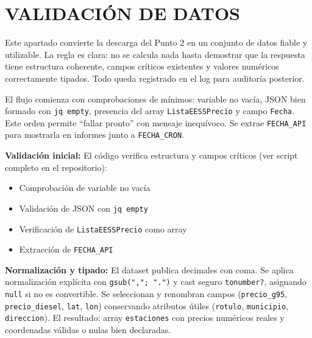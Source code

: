 \chapter{VALIDACIÓN DE DATOS}

Este apartado convierte la descarga del Punto 2 en un conjunto de datos fiable y utilizable. La regla es clara: no se calcula nada hasta demostrar que la respuesta tiene estructura coherente, campos críticos existentes y valores numéricos correctamente tipados. Todo queda registrado en el log para auditoría posterior.

El flujo comienza con comprobaciones de mínimos: variable no vacía, JSON bien formado con \texttt{jq empty}, presencia del array \texttt{ListaEESSPrecio} y campo \texttt{Fecha}. Este orden permite ``fallar pronto'' con mensaje inequívoco. Se extrae \texttt{FECHA\_API} para mostrarla en informes junto a \texttt{FECHA\_CRON}.

\textbf{Validación inicial:} El código verifica estructura y campos críticos (ver script completo en el repositorio):

\begin{itemize}[noitemsep]
  \item Comprobación de variable no vacía
  \item Validación de JSON con \texttt{jq empty}
  \item Verificación de \texttt{ListaEESSPrecio} como array
  \item Extracción de \texttt{FECHA\_API}
\end{itemize}

\textbf{Normalización y tipado:} El dataset publica decimales con coma. Se aplica normalización explícita con \texttt{gsub(","; ".")} y cast seguro \texttt{tonumber?}, asignando \texttt{null} si no es convertible. Se seleccionan y renombran campos (\texttt{precio\_g95}, \texttt{precio\_diesel}, \texttt{lat}, \texttt{lon}) conservando atributos útiles (\texttt{rotulo}, \texttt{municipio}, \texttt{direccion}). El resultado: array \texttt{estaciones} con precios numéricos reales y coordenadas válidas o nulas bien declaradas.

